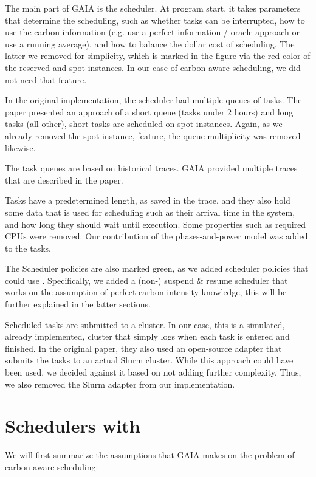 The main part of GAIA is the scheduler. At program start, it takes parameters that determine the scheduling, such as whether tasks can be interrupted, how to use the carbon information (e.g. use a perfect-information / oracle approach or use a running average), and how to balance the dollar cost of scheduling. 
The latter we removed for simplicity, which is marked in the figure via the red color of the reserved and spot instances. In our case of carbon-aware scheduling, we did not need that feature.

In the original implementation, the scheduler had multiple queues of tasks. 
The paper presented an approach of a short queue (tasks under 2 hours) and long tasks (all other), short tasks are scheduled on spot instances. 
Again, as we already removed the spot instance, feature, the queue multiplicity was removed likewise.

The task queues are based on historical traces. GAIA provided multiple traces that are described in the paper.

Tasks have a predetermined length, as saved in the trace, and they also hold some data that is used for scheduling such as their arrival time in the system, and how long they should wait until execution. 
Some properties such as required CPUs were removed.
Our contribution of the phases-and-power model was added to the tasks.

The Scheduler policies are also marked green, as we added scheduler policies that could use \modelname. Specifically, we added a (non-) suspend \& resume scheduler that works on the assumption of perfect carbon intensity knowledge, this will be further explained in the latter sections.

Scheduled tasks are submitted to a cluster.
In our case, this is a simulated, already implemented, cluster that simply logs when each task is entered and finished. 
In the original paper, they also used an open-source adapter that submits the tasks to an actual Slurm cluster. 
While this approach could have been used, we decided against it based on not adding further complexity. 
Thus, we also removed the Slurm adapter from our implementation.

\chapter{Schedulers with \modelname{}}

We will first summarize the assumptions that GAIA makes on the problem of carbon-aware scheduling:


